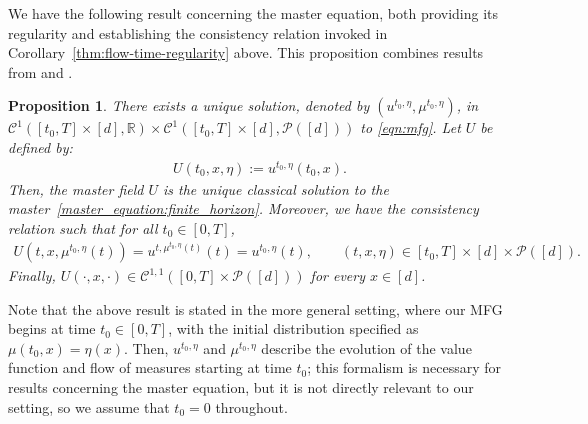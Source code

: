 \documentclass[11pt,reqno]{amsart}
\numberwithin{equation}{section}
\theoremstyle{plain}
\newtheorem{proposition}[theorem]{Proposition}
\newcommand{\R}{\mathbb{R}}
\newcommand{\calC}{{\mathcal C}}
\newcommand{\calP}{{\mathcal P}}
\newcommand{\1}{\boldsymbol{\mathbbm{1}}}
\begin{document}
We have the following result concerning the master equation, both providing its regularity and establishing the consistency relation invoked in Corollary~\ref{thm:flow-time-regularity} above. This proposition combines results from \cite[Proposition 1, Proposition 5,
Theorem 6]{cec-pel2019} and \cite[Section 1.2.4]{CardaliaguetDelarueLasryLions}.
\label{sec:master-eq}
\begin{proposition}\label{prop:me_results}
There exists a unique solution, denoted by $(u^{t_0,\eta}, \mu^{t_0,\eta})$, in $\calC^{1}([t_0, T] \times [d], \R) \times \calC^{1}([t_0,T] \times [d], \calP([d]))$ to \eqref{eqn:mfg}. Let $U$ be defined by: 
\begin{align}\label{eqn:U_def}
    U(t_0,x,\eta) := u^{t_0,\eta} (t_0,x).
\end{align} 
Then, the master field $U$ is the unique classical solution to the master~\eqref{master_equation:finite_horizon}. Moreover, we have the consistency relation such that for all $t_0 \in [0,T]$, 
\begin{align}\label{eqn:consistency_relation}
    U(t,x,\mu^{t_0,\eta}(t))=u^{t,\mu^{t_0,\eta}(t)}(t)=u^{t_0,\eta}(t), \qquad (t, x, \eta) \in [t_0,T] \times [d] \times \calP([d]).
\end{align}
Finally, $U(\cdot, x,\cdot) \in \calC^{1,1}([0,T] \times \calP([d]))$ for every $x\in [d]$.
\end{proposition}
Note that the above result is stated in the more general setting, where our MFG begins at time $t_0 \in [0, T]$, with the initial distribution specified as $\mu(t_0, x) = \eta(x)$. Then, $u^{t_0, \eta}$ and $\mu^{t_0, \eta}$ describe the evolution of the value function and flow of measures starting at time $t_0$; this formalism is necessary for results concerning the master equation, but it is not directly relevant to our setting, so we assume that $t_0 = 0$ throughout.
\end{document}
